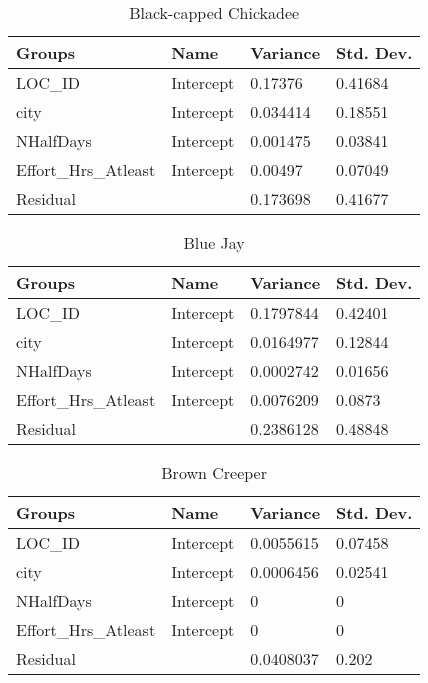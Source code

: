 \begin{longtable}[c]{|l|l|l|l|}
\caption{Black-capped Chickadee}
\label{my-label}\\
\hline
Groups               & Name      & Variance & Std. Dev. \\ \hline
\endhead
%
LOC\_ID              & Intercept & 0.17376  & 0.41684   \\ \hline
city                 & Intercept & 0.034414 & 0.18551   \\ \hline
NHalfDays            & Intercept & 0.001475 & 0.03841   \\ \hline
Effort\_Hrs\_Atleast & Intercept & 0.00497  & 0.07049   \\ \hline
Residual             &           & 0.173698 & 0.41677   \\ \hline
\end{longtable}

\begin{longtable}[c]{|l|l|l|l|}
\caption{Blue Jay}
\label{my-label}\\
\hline
Groups               & Name      & Variance  & Std. Dev. \\ \hline
\endhead
%
LOC\_ID              & Intercept & 0.1797844 & 0.42401   \\ \hline
city                 & Intercept & 0.0164977 & 0.12844   \\ \hline
NHalfDays            & Intercept & 0.0002742 & 0.01656   \\ \hline
Effort\_Hrs\_Atleast & Intercept & 0.0076209 & 0.0873    \\ \hline
Residual             &           & 0.2386128 & 0.48848   \\ \hline
\end{longtable}

\begin{longtable}[c]{|l|l|l|l|}
\caption{Brown Creeper}
\label{my-label}\\
\hline
Groups               & Name      & Variance  & Std. Dev. \\ \hline
\endhead
%
LOC\_ID              & Intercept & 0.0055615 & 0.07458   \\ \hline
city                 & Intercept & 0.0006456 & 0.02541   \\ \hline
NHalfDays            & Intercept & 0         & 0         \\ \hline
Effort\_Hrs\_Atleast & Intercept & 0         & 0         \\ \hline
Residual             &           & 0.0408037 & 0.202     \\ \hline
\end{longtable}

